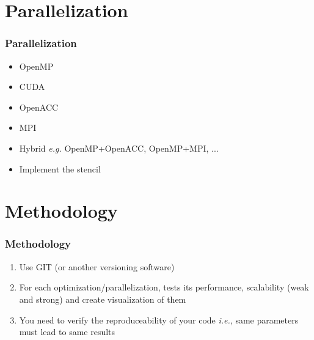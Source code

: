 \documentclass{beamer}
\begin{document}
\section{Parallelization}
\begin{frame}
 \frametitle{Parallelization}
 \begin{itemize}
  \item OpenMP
  \item CUDA
  \item OpenACC
  \item MPI
  \item Hybrid \textit{e.g.} OpenMP+OpenACC, OpenMP+MPI, ...
  \vfill
  \item Implement the stencil
 \end{itemize}
\end{frame}


\section{Methodology}
\begin{frame}
 \frametitle{Methodology}
\begin{enumerate}
 \item Use GIT (or another versioning software)
 \item For each optimization/parallelization, tests its performance, scalability (weak and strong) and create visualization of them
 \item You need to verify the reproduceability of your code \textit{i.e.}, same parameters must lead to same results
\end{enumerate}

 \end{frame}
\end{document}
